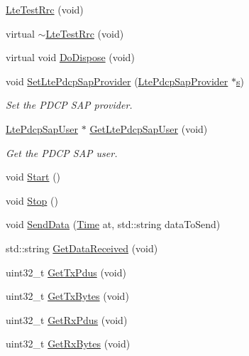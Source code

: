 \begin{DoxyCompactItemize}
\item 
\hyperlink{classns3_1_1LteTestRrc_a2b781b4396e3f489fbe6bede9771d7ac}{Lte\+Test\+Rrc} (void)
\item 
virtual \hyperlink{classns3_1_1LteTestRrc_afcb44da7f0209bb4f9611e5b5b9205c2}{$\sim$\+Lte\+Test\+Rrc} (void)
\item 
virtual void \hyperlink{classns3_1_1LteTestRrc_a914dddb60669e8852897d3ebafc585c9}{Do\+Dispose} (void)
\item 
void \hyperlink{classns3_1_1LteTestRrc_a305f8b59a54e6af296410159bf60b7df}{Set\+Lte\+Pdcp\+Sap\+Provider} (\hyperlink{classns3_1_1LtePdcpSapProvider}{Lte\+Pdcp\+Sap\+Provider} $\ast$\hyperlink{generate__test__data__lte__sinr_8m_ad83eeb3a142285d1243a08c6b7026df8}{s})
\begin{DoxyCompactList}\small\item\em Set the P\+D\+CP S\+AP provider. \end{DoxyCompactList}\item 
\hyperlink{classns3_1_1LtePdcpSapUser}{Lte\+Pdcp\+Sap\+User} $\ast$ \hyperlink{classns3_1_1LteTestRrc_a9b786ae8755823df0fcff0c1986de3ad}{Get\+Lte\+Pdcp\+Sap\+User} (void)
\begin{DoxyCompactList}\small\item\em Get the P\+D\+CP S\+AP user. \end{DoxyCompactList}\item 
void \hyperlink{classns3_1_1LteTestRrc_a3ea3194da9eaef4bcc373eabc1251229}{Start} ()
\item 
void \hyperlink{classns3_1_1LteTestRrc_a3bd929a97d56774cf82eb98fdf3cce84}{Stop} ()
\item 
void \hyperlink{classns3_1_1LteTestRrc_a08a76ccce79db7f4b8ce93d4e392df75}{Send\+Data} (\hyperlink{classns3_1_1Time}{Time} at, std\+::string data\+To\+Send)
\item 
std\+::string \hyperlink{classns3_1_1LteTestRrc_a56998516a3ac5cab76243d5ba80dd52d}{Get\+Data\+Received} (void)
\item 
uint32\+\_\+t \hyperlink{classns3_1_1LteTestRrc_aa0aaeaeaa36a89d141abc5cc6f83c1d2}{Get\+Tx\+Pdus} (void)
\item 
uint32\+\_\+t \hyperlink{classns3_1_1LteTestRrc_a07149b1f7c13923f822c94301d90ee73}{Get\+Tx\+Bytes} (void)
\item 
uint32\+\_\+t \hyperlink{classns3_1_1LteTestRrc_ac7fb9c58a5534e3fe4a8f8cf6fce0b66}{Get\+Rx\+Pdus} (void)
\item 
uint32\+\_\+t \hyperlink{classns3_1_1LteTestRrc_a4ae566c997b392812c97bde6cdaf01c1}{Get\+Rx\+Bytes} (void)

\end{DoxyCompactItemize}
